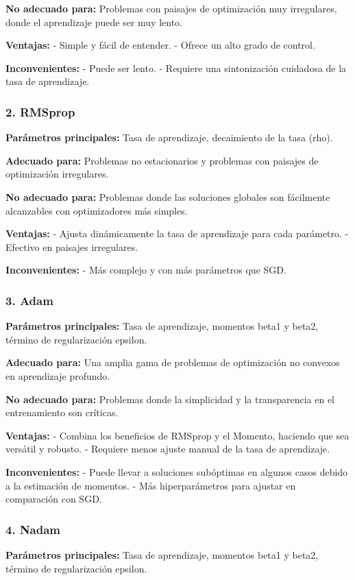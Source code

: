 \documentclass[11pt]{article}
\begin{document}
\textbf{No adecuado para:} Problemas con paisajes de optimización muy
irregulares, donde el aprendizaje puede ser muy lento.

\textbf{Ventajas:} - Simple y fácil de entender. - Ofrece un alto grado de
control.

\textbf{Inconvenientes:} - Puede ser lento. - Requiere una sintonización
cuidadosa de la tasa de aprendizaje.

\subsubsection{2. RMSprop}
\label{sec:orgc24c9b8}
\textbf{Parámetros principales:} Tasa de aprendizaje, decaimiento de la tasa
(rho).

\textbf{Adecuado para:} Problemas no estacionarios y problemas con paisajes de
optimización irregulares.

\textbf{No adecuado para:} Problemas donde las soluciones globales son
fácilmente alcanzables con optimizadores más simples.

\textbf{Ventajas:} - Ajusta dinámicamente la tasa de aprendizaje para cada
parámetro. - Efectivo en paisajes irregulares.

\textbf{Inconvenientes:} - Más complejo y con más parámetros que SGD.

\subsubsection{3. Adam}
\label{sec:orge316a3b}
\textbf{Parámetros principales:} Tasa de aprendizaje, momentos beta1 y beta2,
término de regularización epsilon.

\textbf{Adecuado para:} Una amplia gama de problemas de optimización no
convexos en aprendizaje profundo.

\textbf{No adecuado para:} Problemas donde la simplicidad y la transparencia en
el entrenamiento son críticas.

\textbf{Ventajas:} - Combina los beneficios de RMSprop y el Momento, haciendo
que sea versátil y robusto. - Requiere menos ajuste manual de la tasa de
aprendizaje.

\textbf{Inconvenientes:} - Puede llevar a soluciones subóptimas en algunos
casos debido a la estimación de momentos. - Más hiperparámetros para
ajustar en comparación con SGD.

\subsubsection{4. Nadam}
\label{sec:orge391be7}
\textbf{Parámetros principales:} Tasa de aprendizaje, momentos beta1 y beta2,
término de regularización epsilon.
\end{document}
